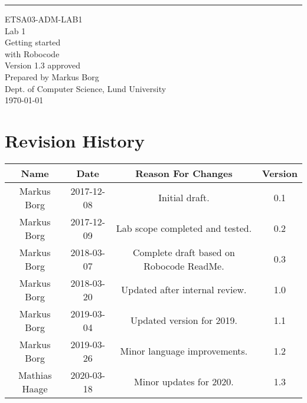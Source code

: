 \documentclass{scrreprt}
\date{}
\def\myversion{1.3 }
\begin{document}
\begin{flushright}
    \rule{16cm}{5pt}\vskip1cm
    \begin{bfseries}
    	\LARGE{ETSA03-ADM-LAB1}\\
    	\vspace{1.5cm}
        \Huge{Lab 1}\\
        \vspace{0.5cm}
        Getting started\\
        \vspace{0.5cm}
        with Robocode\\
        \vspace{1.5cm}
        \LARGE{Version \myversion approved}\\
        \vspace{1.5cm}
        Prepared by Markus Borg\\
        Dept. of Computer Science, Lund University\\
        \vspace{1.5cm}
        \today\\
    \end{bfseries}
\end{flushright}


\chapter*{Revision History}

\begin{center}
    \begin{tabular}{|c|c|c|c|}
        \hline
	    Name & Date & Reason For Changes & Version\\
        \hline
	    Markus Borg & 2017-12-08 & Initial draft. & 0.1\\
        \hline
        Markus Borg & 2017-12-09 & Lab scope completed and tested. & 0.2\\
        \hline
        Markus Borg & 2018-03-07 & Complete draft based on Robocode ReadMe. & 0.3\\
        \hline
        Markus Borg & 2018-03-20 & Updated after internal review. & 1.0\\
        \hline
        Markus Borg & 2019-03-04 & Updated version for 2019. & 1.1\\
        \hline
        Markus Borg & 2019-03-26 & Minor language improvements. & 1.2\\
        \hline
        Mathias Haage & 2020-03-18 & Minor updates for 2020. & 1.3\\
        \hline
    \end{tabular}
\end{center}
\end{document}
